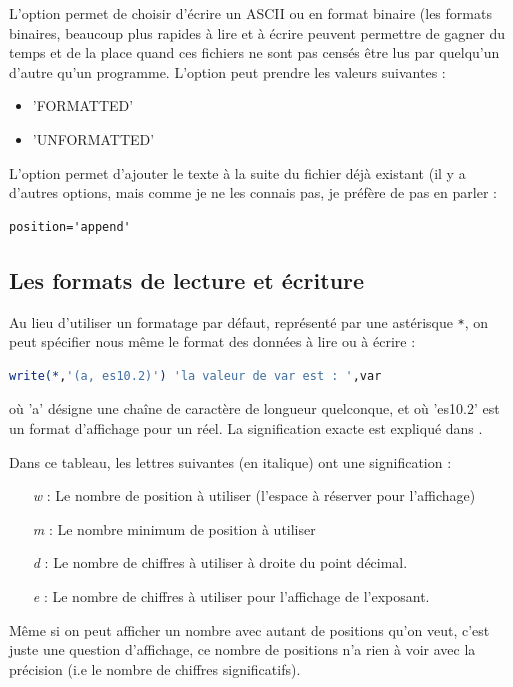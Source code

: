 \documentclass[a4paper,twoside]{article}
\begin{document}
L'option  permet de choisir d'écrire un ASCII ou en format binaire (les formats binaires, beaucoup plus rapides à lire et à écrire peuvent permettre de gagner du temps et de la place quand ces fichiers ne sont pas censés être lus par quelqu'un d'autre qu'un programme. L'option  peut prendre les valeurs suivantes : 
\begin{itemize}
\item 'FORMATTED'
\item 'UNFORMATTED'
\end{itemize}

L'option  permet d'ajouter le texte à la suite du fichier déjà existant (il y a d'autres options, mais comme je ne les connais pas, je préfère de pas en parler : 
\begin{verbatim}
position='append'
\end{verbatim}



\subsection{Les formats de lecture et écriture}\label{sec:formats}
Au lieu d'utiliser un formatage par défaut, représenté par une astérisque \texttt{*}, on peut spécifier nous même le format des données à lire ou à écrire : 
\begin{lstlisting}[language=Fortran]
write(*,'(a, es10.2)') 'la valeur de var est : ',var
\end{lstlisting}
où 'a' désigne une chaîne de caractère de longueur quelconque, et où 'es10.2' est un format d'affichage pour un réel. La signification exacte est expliqué dans . 

Dans ce tableau, les lettres suivantes (en italique) ont une signification :
\begin{itemize}
\item[\emph{w}]: Le nombre de position à utiliser (l'espace à réserver pour l'affichage)
\item[\emph{m}]: Le nombre minimum de position à utiliser
\item[\emph{d}]: Le nombre de chiffres à utiliser à droite du point décimal.
\item[\emph{e}]: Le nombre de chiffres à utiliser pour l'affichage de l'exposant.
\end{itemize}

Même si on peut afficher un nombre avec autant de positions qu'on veut, c'est juste une question d'affichage, ce nombre de positions n'a rien à voir avec la précision (i.e le nombre de chiffres significatifs). 
\end{document}
